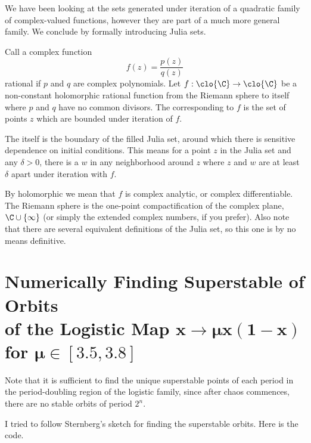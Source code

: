 \documentclass[x11names,reqno,14pt]{extarticle}
\begin{document}
We have been looking at the sets generated under iteration of a quadratic family of complex-valued functions, however they are part of a much more general family. We conclude by formally introducing Julia sets.
\begin{defn}
	Call a complex function \[f(z) = \frac{p(z)}{q(z)}\] rational if $p$ and $q$ are complex polynomials. Let $f : \clo{\C} \to \clo{\C}$ be a non-constant holomorphic rational function from the Riemann sphere to itself where $p$ and $q$ have no common divisors. The  corresponding to $f$ is the set of points $z$ which are bounded under iteration of $f$.
\end{defn}
\begin{defn}
	The  itself is the boundary of the filled Julia set, around which there is sensitive dependence on initial conditions. This means for a point $z$ in the Julia set and any $\delta > 0$, there is a $w$ in any neighborhood around $z$ where $z$ and $w$ are at least $\delta$ apart under iteration with $f$.
\end{defn}
\begin{rem}
	By holomorphic we mean that $f$ is complex analytic, or complex differentiable. The Riemann sphere is the one-point compactification of the complex plane, $\C \cup \{\infty\}$ (or simply the extended complex numbers, if you prefer). Also note that there are several equivalent definitions of the Julia set, so this one is by no means definitive.
\end{rem}

\newpage
\section{Numerically Finding Superstable of Orbits\\ of the Logistic Map $\bm{x \to \mu x(1-x)}$ for $\bm{\mu \in [3.5,3.8]}$}
Note that it is sufficient to find the unique superstable points of each period in the period-doubling region of the logistic family, since after chaos commences, there are no stable orbits of period $2^n$.

I tried to follow Sternberg's sketch for finding the superstable orbits. Here is the code.
\begin{mdframed}[
	backgroundcolor=Background,
	hidealllines=true,
	innertopmargin=0pt,
	innerbottommargin=0pt,
	innerleftmargin=0pt,
	innerrightmargin=0pt
	]
	
\end{mdframed}
\end{document}
